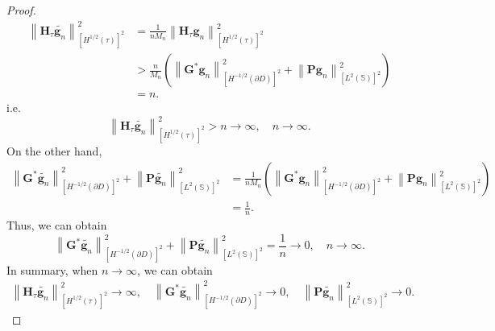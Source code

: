 \documentclass[10pt,a4paper]{amsart}
\begin{document}
\begin{proof}
\begin{equation}\begin{aligned}
\left\| \mathbf H_{\tau} \tilde{\mathbf g_n} \right\|^2_{\left[H^{1/2}\left(\tau \right) \right] ^2 }
&= \frac{1}{n M_n} \left\| \mathbf H_{\tau} \mathbf g_n \right\|^2_{\left[H^{1/2}\left(\tau \right) \right] ^2 } \\
&>\frac{n}{M_n} \left( \left\|  \mathbf G^* \mathbf g_n \right\|^2_{\left[H^{-1/2}\left(\partial D \right) \right] ^2}+\left\|  \mathbf P \mathbf g_n \right\|^2_{\left[L^{2}\left(\mathbb S \right) \right] ^2} \right) \\
&= n.
\end{aligned}\end{equation}
i.e. 
$$
\left\| \mathbf H_{\tau} \tilde{\mathbf g_n} \right\|^2_{\left[H^{1/2}\left(\tau \right) \right] ^2 } > n \to \infty,\quad   n \to \infty .
$$
On the other hand, 
\begin{equation}\begin{aligned}
		\left\| \mathbf G^* \tilde{\mathbf g_n} \right\|^2_{\left[H^{-1/2}\left(\partial D \right) \right] ^2}+\left\| \mathbf P \tilde{\mathbf g_n} \right\|^2_{\left[L^{2}\left(\mathbb S \right) \right] ^2}
		&= \frac{1}{n M_n} \left(\left\| \mathbf G^* \mathbf g_n \right\|^2_{\left[H^{-1/2}\left(\partial D \right) \right] ^2}+\left\| \mathbf P \mathbf g_n \right\|^2_{\left[L^{2}\left(\mathbb S \right) \right] ^2} \right) \\
		&= \frac{1}{n}.
\end{aligned}\end{equation}
Thus, we can obtain
$$
\left\| \mathbf G^* \tilde{\mathbf g_n} \right\|^2_{\left[H^{-1/2}\left(\partial D \right) \right] ^2}+\left\| \mathbf P \tilde{\mathbf g_n} \right\|^2_{\left[L^{2}\left(\mathbb S \right) \right] ^2}= \frac{1}{n} \to 0, \quad n \to \infty .
$$
In summary, when $n \to \infty $, we can obtain
\begin{equation}\begin{aligned}\label{eq:HGPasymptotic}
  \left\| \mathbf H_{\tau} \tilde{\mathbf g_n} \right\|^2_{\left[H^{1/2}\left(\tau \right) \right] ^2 } \to \infty ,\quad \left\| \mathbf G^* \tilde{\mathbf g_n} \right\|^2_{\left[H^{-1/2}\left(\partial D \right) \right] ^2} \to 0,\quad \left\| \mathbf P \tilde{\mathbf g_n} \right\|^2_{\left[L^{2}\left(\mathbb S \right) \right] ^2} \to 0.
 \end{aligned}\end{equation}


\end{proof}
\end{document}
